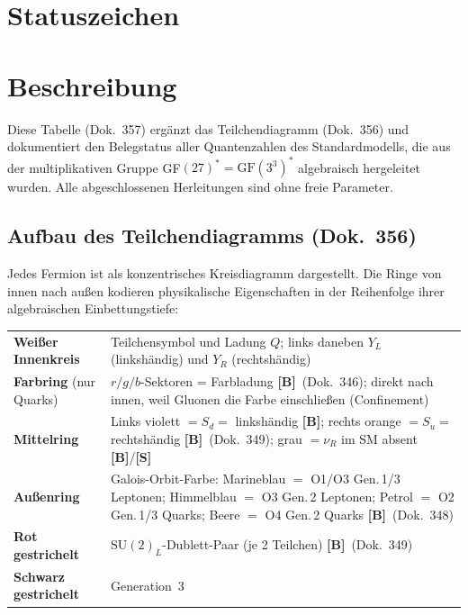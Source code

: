 \providecommand{\BM}{\textbf{[B]}}
\providecommand{\KM}{\textbf{[K]}}
\providecommand{\SM}{\textbf{[S]}}
\providecommand{\XM}{\textbf{[X]}}

{}

\section*{Statuszeichen}


\section*{Beschreibung}

Diese Tabelle (Dok.~357) ergänzt das Teilchendiagramm (Dok.~356) und dokumentiert den Belegstatus aller Quantenzahlen des
Standardmodells, die aus der multiplikativen Gruppe GF$(27)^* =
\mathrm{GF}(3^3)^*$ algebraisch hergeleitet wurden.
Alle abgeschlossenen Herleitungen sind ohne freie Parameter.

\subsection*{Aufbau des Teilchendiagramms (Dok.~356)}

Jedes Fermion ist als konzentrisches Kreisdiagramm dargestellt.
Die Ringe von innen nach außen kodieren physikalische Eigenschaften
in der Reihenfolge ihrer algebraischen Einbettungstiefe:

\begin{center}
\begin{tabular}{@{}lp{10cm}@{}}
\textbf{Weißer Innenkreis} & Teilchensymbol und Ladung $Q$; links daneben $Y_L$ (linkshändig) und $Y_R$ (rechtshändig) \\[3pt]
\textbf{Farbring} (nur Quarks) & $r/g/b$-Sektoren = Farbladung \BM\ (Dok.~346);
  direkt nach innen, weil Gluonen die Farbe einschließen (Confinement) \\[3pt]
\textbf{Mittelring} & Links violett $= S_d =$ linkshändig \BM;
  rechts orange $= S_u =$ rechtshändig \BM\ (Dok.~349);
  grau $= \nu_R$ im SM absent \BM/\SM \\[3pt]
\textbf{Außenring} & Galois-Orbit-Farbe: Marineblau $=$ O1/O3 Gen.\,1/3 Leptonen;
  Himmelblau $=$ O3 Gen.\,2 Leptonen; Petrol $=$ O2 Gen.\,1/3 Quarks;
  Beere $=$ O4 Gen.\,2 Quarks \BM\ (Dok.~348) \\[3pt]
\textbf{Rot gestrichelt} & SU$(2)_L$-Dublett-Paar (je 2 Teilchen) \BM\ (Dok.~349) \\[3pt]
\textbf{Schwarz gestrichelt} & Generation~3 \\
\end{tabular}
\end{center}

